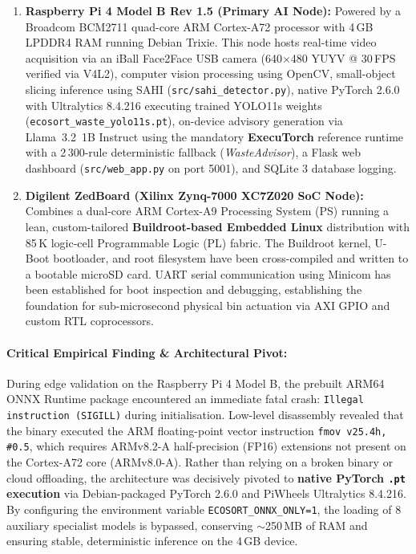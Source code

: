 \documentclass[12pt,a4paper]{article}
\begin{document}
\begin{enumerate}[label=\textbf{\arabic*.}]
  \item \textbf{Raspberry Pi 4 Model B Rev 1.5 (Primary AI Node):} Powered by a Broadcom
  BCM2711 quad-core ARM Cortex-A72 processor with 4\,GB LPDDR4 RAM running Debian Trixie.
  This node hosts real-time video acquisition via an iBall Face2Face USB camera (640$\times$480
  YUYV @ 30\,FPS verified via V4L2), computer vision processing using OpenCV, small-object
  slicing inference using SAHI (\texttt{src/sahi\_detector.py}), native PyTorch 2.6.0 with
  Ultralytics 8.4.216 executing trained YOLO11s weights (\texttt{ecosort\_waste\_yolo11s.pt}),
  on-device advisory generation via Llama~3.2~1B Instruct using the mandatory \textbf{ExecuTorch}
  reference runtime with a 2\,300-rule deterministic fallback (\textit{WasteAdvisor}), a Flask
  web dashboard (\texttt{src/web\_app.py} on port 5001), and SQLite 3 database logging.
  
  \item \textbf{Digilent ZedBoard (Xilinx Zynq-7000 XC7Z020 SoC Node):} Combines a dual-core
  ARM Cortex-A9 Processing System (PS) running a lean, custom-tailored \textbf{Buildroot-based
  Embedded Linux} distribution with 85\,K logic-cell Programmable Logic (PL) fabric. The
  Buildroot kernel, U-Boot bootloader, and root filesystem have been cross-compiled and written
  to a bootable microSD card. UART serial communication using Minicom has been established
  for boot inspection and debugging, establishing the foundation for sub-microsecond physical bin
  actuation via AXI GPIO and custom RTL coprocessors.
\end{enumerate}

\paragraph{Critical Empirical Finding \& Architectural Pivot:}
During edge validation on the Raspberry Pi 4 Model B, the prebuilt ARM64 ONNX Runtime package
encountered an immediate fatal crash: \texttt{Illegal instruction (SIGILL)} during initialisation.
Low-level disassembly revealed that the binary executed the ARM floating-point vector instruction
\texttt{fmov v25.4h, \#0.5}, which requires ARMv8.2-A half-precision (FP16) extensions not present
on the Cortex-A72 core (ARMv8.0-A). Rather than relying on a broken binary or cloud offloading,
the architecture was decisively pivoted to \textbf{native PyTorch \texttt{.pt} execution} via
Debian-packaged PyTorch 2.6.0 and PiWheels Ultralytics 8.4.216. By configuring the environment
variable \texttt{ECOSORT\_ONNX\_ONLY=1}, the loading of 8 auxiliary specialist models is bypassed,
conserving $\sim$250\,MB of RAM and ensuring stable, deterministic inference on the 4\,GB device.
\end{document}
